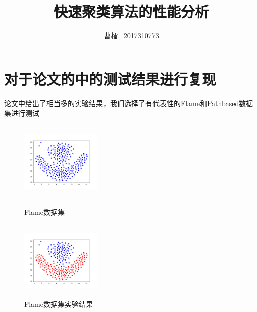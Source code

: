 \documentclass{article}
\author{曹檑
    \ 2017310773}
\title{快速聚类算法的性能分析}
\begin{document}
  \maketitle
    
    \section{对于论文的中的测试结果进行复现} 论文中给出了相当多的实验结果，我们选择了有代表性的Flame和Pathbased数据集进行测试
    \begin{figure}[!ht]
    \centering

    \begin{minipage}[c]{0.5\textwidth}
        \centering
      \includegraphics[height=1.5in,width=1.5in]{Flame}
      \caption{Flame数据集}\label{aa}
    \end{minipage}%
    \begin{minipage}[c]{0.5\textwidth}
        \centering
      \includegraphics[height=1.5in,width=1.5in]{Flame2}
      \caption{Flame数据集实验结果}\label{aa}
    \end{minipage}
    \end{figure}
\end{document}
